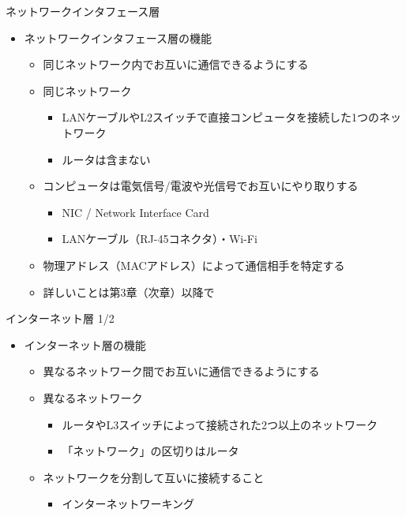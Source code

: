 \documentclass[12pt,aspectratio=169]{beamer}
\begin{document}
\begin{frame}{ネットワークインタフェース層}

  \begin{itemize}
    \item ネットワークインタフェース層の機能
      \begin{itemize}
        \item 同じネットワーク内でお互いに通信できるようにする
        \item 同じネットワーク
          \begin{itemize}
            \item LANケーブルやL2スイッチで直接コンピュータを接続した1つのネットワーク
            \item ルータは含まない
          \end{itemize}
        \item コンピュータは電気信号/電波や光信号でお互いにやり取りする
          \begin{itemize}
            \item NIC / Network Interface Card
            \item LANケーブル（RJ-45コネクタ）・Wi-Fi
          \end{itemize}
        \item 物理アドレス（MACアドレス）によって通信相手を特定する
        \item 詳しいことは第3章（次章）以降で

      \end{itemize}

  \end{itemize}

\end{frame}


\begin{frame}{インターネット層 1/2}

  \begin{itemize}
    \item インターネット層の機能
      \begin{itemize}
        \item 異なるネットワーク間でお互いに通信できるようにする
        \item 異なるネットワーク
          \begin{itemize}
            \item ルータやL3スイッチによって接続された2つ以上のネットワーク
            \item 「ネットワーク」の区切りはルータ
          \end{itemize}

        \item ネットワークを分割して互いに接続すること
          \begin{itemize}
            \item インターネットワーキング
          \end{itemize}

      \end{itemize}

  \end{itemize}

\end{frame}
\end{document}

